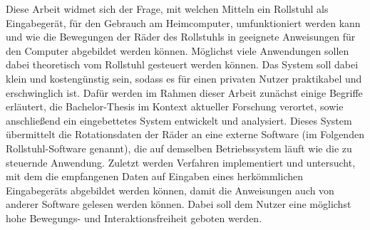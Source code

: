 Diese Arbeit widmet sich der Frage, mit welchen Mitteln ein Rollstuhl als Eingabegerät, für den Gebrauch am Heimcomputer, umfunktioniert werden kann und wie die Bewegungen der Räder des Rollstuhls in geeignete Anweisungen für den Computer abgebildet werden können.
Möglichst viele Anwendungen sollen dabei theoretisch vom Rollstuhl gesteuert werden können.
Das System soll dabei klein und kostengünstig sein, sodass es für einen privaten Nutzer praktikabel und erschwinglich ist.
Dafür werden im Rahmen dieser Arbeit zunächst einige Begriffe erläutert, die Bachelor-Thesis im Kontext aktueller Forschung verortet, sowie anschließend ein eingebettetes System entwickelt und analysiert.
Dieses System übermittelt die Rotationsdaten der Räder an eine externe Software (im Folgenden Rollstuhl-Software genannt), die auf demselben Betriebssystem läuft wie die zu steuernde Anwendung.
Zuletzt werden Verfahren implementiert und untersucht, mit dem die empfangenen Daten auf Eingaben eines herkömmlichen Eingabegeräts abgebildet werden können, damit die Anweisungen auch von anderer Software gelesen werden können.
Dabei soll dem Nutzer eine möglichst hohe Bewegungs- und Interaktionsfreiheit geboten werden.